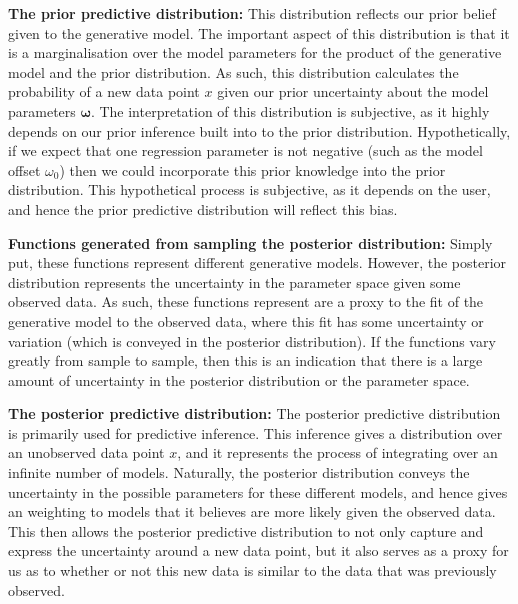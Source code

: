 \documentclass{article}
\begin{document}
\textbf{The prior predictive distribution:} This distribution reflects our prior belief given to the generative model. The important aspect of this distribution is that it is a marginalisation over the model parameters for the product of the generative model and the prior distribution. As such, this distribution calculates the probability of a new data point $x$ given our prior uncertainty about the model parameters $\boldsymbol\omega$. The interpretation of this distribution is subjective, as it highly depends on our prior inference built into to the prior distribution. Hypothetically, if we expect that one regression parameter is not negative (such as the model offset $\omega_0$) then we could incorporate this prior knowledge into the prior distribution. This hypothetical process is subjective, as it depends on the user, and hence the prior predictive distribution will reflect this bias.

\textbf{Functions generated from sampling the posterior distribution:} Simply put, these functions represent different generative models. However, the posterior distribution represents the uncertainty in the parameter space given some observed data. As such, these functions represent are a proxy to the fit of the generative model to the observed data, where this fit has some uncertainty or variation (which is conveyed in the posterior distribution). If the functions vary greatly from sample to sample, then this is an indication that there is a large amount of uncertainty in the posterior distribution or the parameter space.

\textbf{The posterior predictive distribution:} The posterior predictive distribution is primarily used for predictive inference. This inference gives a distribution over an unobserved data point $x$, and it represents the process of integrating over an infinite number of models. Naturally, the posterior distribution conveys the uncertainty in the possible parameters for these different models, and hence gives an weighting to models that it believes are more likely given the observed data. This then allows the posterior predictive distribution to not only capture and express the uncertainty around a new data point, but it also serves as a proxy for us as to whether or not this new data is similar to the data that was previously observed.
\end{document}
